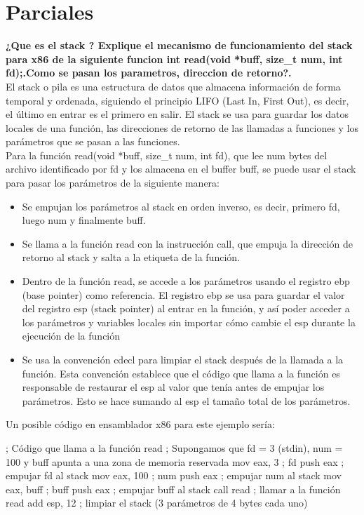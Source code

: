 \documentclass[../main.tex]{subfiles}
\begin{document}

\section{Parciales}
\textbf{¿Que es el stack ? Explique el mecanismo de funcionamiento del stack para x86 de la siguiente funcion int read(void *buff, size\_t num, int fd);.Como se pasan los parametros, direccion de retorno?.}\\

El stack o pila es una estructura de datos que almacena información de forma temporal y ordenada, siguiendo el principio LIFO (Last In, First Out), es decir, el último en entrar es el primero en salir. El stack se usa para guardar los datos locales de una función, las direcciones de retorno de las llamadas a funciones y los parámetros que se pasan a las funciones.\\

Para la función read(void *buff, size\_t num, int fd), que lee num bytes del archivo identificado por fd y los almacena en el buffer buff, se puede usar el stack para pasar los parámetros de la siguiente manera:
\begin{itemize}
    \item Se empujan los parámetros al stack en orden inverso, es decir, primero fd, luego num y finalmente buff.
    \item Se llama a la función read con la instrucción call, que empuja la dirección de retorno al stack y salta a la etiqueta de la función.
    \item Dentro de la función read, se accede a los parámetros usando el registro ebp (base pointer) como referencia. El registro ebp se usa para guardar el valor del registro esp (stack pointer) al entrar en la función, y así poder acceder a los parámetros y variables locales sin importar cómo cambie el esp durante la ejecución de la función
    \item Se usa la convención cdecl para limpiar el stack después de la llamada a la función. Esta convención establece que el código que llama a la función es responsable de restaurar el esp al valor que tenía antes de empujar los parámetros. Esto se hace sumando al esp el tamaño total de los parámetros.
\end{itemize}

Un posible código en ensamblador x86 para este ejemplo sería:

; Código que llama a la función read ; Supongamos que fd = 3 (stdin), num = 100 y buff apunta a una zona de memoria reservada mov eax, 3 ; fd push eax ; empujar fd al stack mov eax, 100 ; num push eax ; empujar num al stack mov eax, buff ; buff push eax ; empujar buff al stack call read ; llamar a la función read add esp, 12 ; limpiar el stack (3 parámetros de 4 bytes cada uno)
\end{document}

